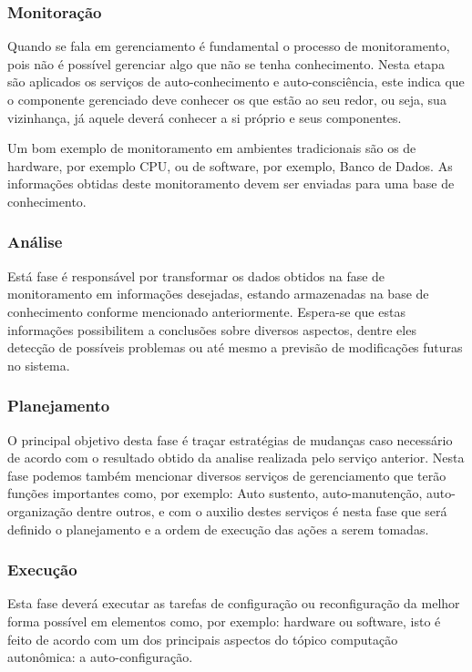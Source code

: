 \documentclass[11pt,twoside]{article}
\begin{document}
\subsubsection{Monitoração} 
Quando se fala em gerenciamento é fundamental o processo de monitoramento, pois não é possível gerenciar algo que não se tenha conhecimento. Nesta etapa são aplicados os serviços de auto-conhecimento e auto-consciência, este indica que o componente gerenciado deve conhecer os que estão ao seu redor, ou seja, sua vizinhança, já aquele deverá conhecer a si próprio e seus componentes. 

Um bom exemplo de monitoramento em ambientes tradicionais são os de hardware, por exemplo CPU, ou de software, por exemplo, Banco de Dados. As informações obtidas deste monitoramento devem ser enviadas para uma base de conhecimento.

\subsubsection{Análise}
Está fase é responsável por transformar os dados obtidos na fase de monitoramento em informações desejadas, estando armazenadas na base de conhecimento conforme mencionado anteriormente. Espera-se que estas informações possibilitem a conclusões sobre diversos aspectos, dentre eles detecção de possíveis problemas ou até mesmo a previsão de modificações futuras no sistema.

\subsubsection{Planejamento}
O principal objetivo desta fase é traçar estratégias de mudanças caso necessário de acordo com o resultado obtido da analise realizada pelo serviço anterior. Nesta fase podemos também mencionar diversos serviços de gerenciamento que terão funções importantes como, por exemplo: Auto sustento, auto-manutenção, auto-organização dentre outros, e com o auxilio destes serviços é nesta fase que será definido o planejamento e a ordem de execução das ações a serem tomadas.

\subsubsection{Execução}
Esta fase deverá executar as tarefas de configuração ou reconfiguração da melhor forma possível em elementos como, por exemplo: hardware ou software, isto é feito de acordo com um dos principais aspectos do tópico computação autonômica: a auto-configuração. 
\end{document}
